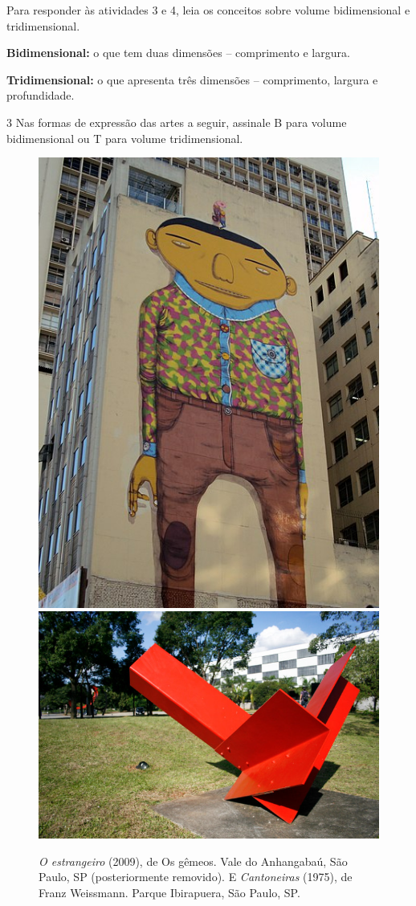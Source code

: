 
\bigskip

\noindent{}Para responder às atividades 3 e 4, leia os conceitos sobre volume
bidimensional e tridimensional.

\begin{mdframed}[linewidth=2pt,linecolor=salmao,backgroundcolor=salmao!20]
\textbf{Bidimensional:} o que tem duas dimensões – comprimento e largura.

\noindent\textbf{Tridimensional:} o que apresenta três dimensões – comprimento, largura e profundidade.
\end{mdframed}

\num{3} Nas formas de expressão das artes a seguir, assinale B para volume bidimensional ou T para volume tridimensional.

\begin{figure}[htpb!]
\includegraphics[width=.5\textwidth]{./imgs/art4a.jpg}
\includegraphics[width=.5\textwidth]{./imgs/art4b.png}
\caption{\emph{O estrangeiro} (2009), de Os gêmeos. Vale do Anhangabaú, São Paulo, SP (posteriormente removido). E \emph{Cantoneiras} (1975), de Franz Weissmann. Parque Ibirapuera, São Paulo, SP.}
\end{figure}

